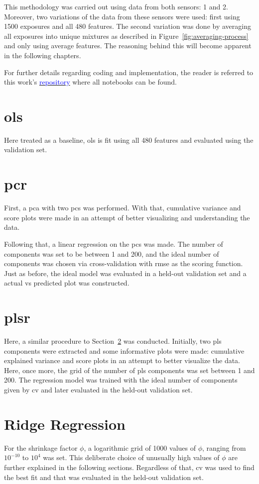 This methodology was carried out using data from both sensors: 1 and 2. Moreover, two variations of the data from these sensors were used: first using 1500 exposures and all 480 features. The second variation was done by averaging all exposures into unique mixtures as described in Figure~\ref{fig:averaging-process} and only using average features. The reasoning behind this will become apparent in the following chapters.

For further details regarding coding and implementation, the reader is referred to this work's \href{https://github.com/cosmourao/thesis}{\textcolor{blue}{repository}} where all notebooks can be found.

\section{\acrlong{ols}}
\label{sec:met-ols}

Here treated as a baseline, \acrshort{ols} is fit using all 480 features and evaluated using the validation set. 

\section{\acrlong{pcr}}
\label{sec:met-pcr}

First, a \acrshort{pca} with two \acrshort{pc}s was performed. With that, cumulative variance and score plots were made in an attempt of better visualizing and understanding the data.

Following that, a linear regression on the \acrshort{pc}s was made. The number of components was set to be between 1 and 200, and the ideal number of components was chosen via cross-validation with \acrshort{rmse} as the scoring function. Just as before, the ideal model was evaluated in a held-out validation set and a actual vs predicted plot was constructed.

\section{\acrlong{plsr}}
\label{sec:met-plsr}

Here, a similar procedure to Section~\ref{sec:met-pcr} was conducted. Initially, two \acrshort{pls} components were extracted and some informative plots were made: cumulative explained variance and score plots in an attempt to better visualize the data. Here, once more, the grid of the number of \acrshort{pls} components was set between 1 and 200. The regression model was trained with the ideal number of components given by \acrshort{cv} and later evaluated in the held-out validation set.

\section{Ridge Regression}
\label{sec:met-ridge}

For the shrinkage factor $\phi$, a logarithmic grid of 1000 values of  $\phi$, ranging from $10^{-10} $ to $10^4$ was set. This deliberate choice of  unusually high values of $\phi$ are further explained in the following sections. Regardless of that, \acrshort{cv} was used to find the best fit and that was evaluated in the held-out validation set.